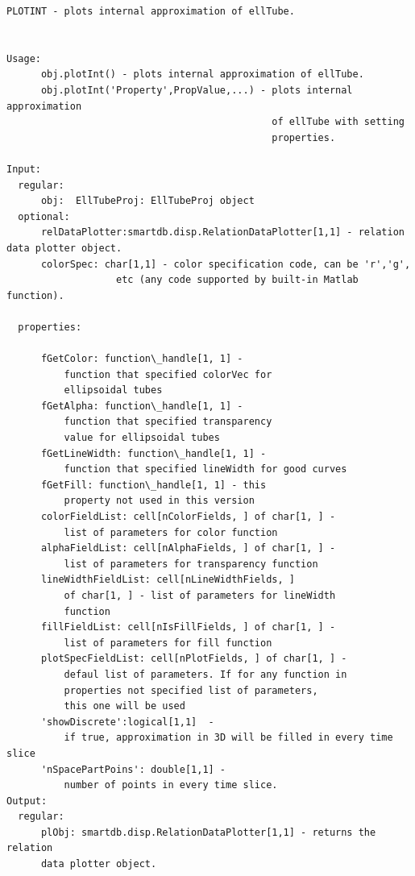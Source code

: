 \documentclass[letterpaper,10pt,english]{sphinxmanual}
\begin{document}
\begin{Verbatim}[commandchars=\\\{\}]
PLOTINT - plots internal approximation of ellTube.


Usage:
      obj.plotInt() - plots internal approximation of ellTube.
      obj.plotInt('Property',PropValue,...) - plots internal approximation
                                              of ellTube with setting
                                              properties.

Input:
  regular:
      obj:  EllTubeProj: EllTubeProj object
  optional:
      relDataPlotter:smartdb.disp.RelationDataPlotter[1,1] - relation data plotter object.
      colorSpec: char[1,1] - color specification code, can be 'r','g',
                   etc (any code supported by built-in Matlab function).

  properties:

      fGetColor: function\_handle[1, 1] -
          function that specified colorVec for
          ellipsoidal tubes
      fGetAlpha: function\_handle[1, 1] -
          function that specified transparency
          value for ellipsoidal tubes
      fGetLineWidth: function\_handle[1, 1] -
          function that specified lineWidth for good curves
      fGetFill: function\_handle[1, 1] - this
          property not used in this version
      colorFieldList: cell[nColorFields, ] of char[1, ] -
          list of parameters for color function
      alphaFieldList: cell[nAlphaFields, ] of char[1, ] -
          list of parameters for transparency function
      lineWidthFieldList: cell[nLineWidthFields, ]
          of char[1, ] - list of parameters for lineWidth
          function
      fillFieldList: cell[nIsFillFields, ] of char[1, ] -
          list of parameters for fill function
      plotSpecFieldList: cell[nPlotFields, ] of char[1, ] -
          defaul list of parameters. If for any function in
          properties not specified list of parameters,
          this one will be used
      'showDiscrete':logical[1,1]  -
          if true, approximation in 3D will be filled in every time slice
      'nSpacePartPoins': double[1,1] -
          number of points in every time slice.
Output:
  regular:
      plObj: smartdb.disp.RelationDataPlotter[1,1] - returns the relation
      data plotter object.
\end{Verbatim}
\end{document}
